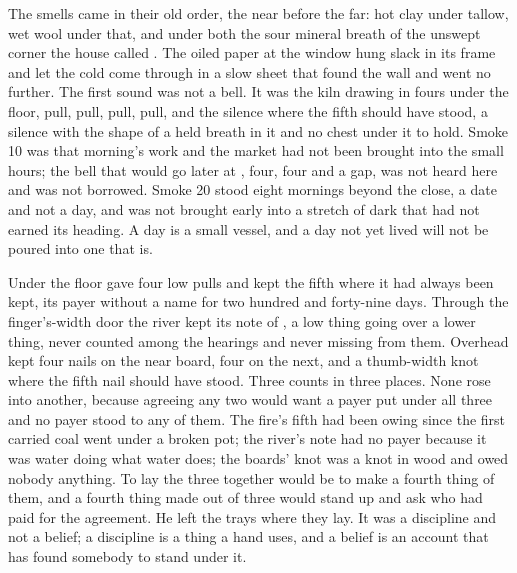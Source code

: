 The smells came in their old order, the near before the far: hot clay under tallow, wet wool under that, and under both the sour mineral breath of the unswept corner the house called . The oiled paper at the window hung slack in its frame and let the cold come through in a slow sheet that found the wall and went no further. The first sound was not a bell. It was the kiln drawing in fours under the floor, pull, pull, pull, pull, and the silence where the fifth should have stood, a silence with the shape of a held breath in it and no chest under it to hold. Smoke 10 was that morning's work and the market had not been brought into the small hours; the bell that would go later at , four, four and a gap, was not heard here and was not borrowed. Smoke 20 stood eight mornings beyond the close, a date and not a day, and was not brought early into a stretch of dark that had not earned its heading. A day is a small vessel, and a day not yet lived will not be poured into one that is.

Under the floor  gave four low pulls and kept the fifth where it had always been kept, its payer without a name for two hundred and forty-nine days. Through the finger's-width door the river kept its note of , a low thing going over a lower thing, never counted among the hearings and never missing from them. Overhead  kept four nails on the near board, four on the next, and a thumb-width knot where the fifth nail should have stood. Three counts in three places. None rose into another, because agreeing any two would want a payer put under all three and no payer stood to any of them. The fire's fifth had been owing since the first carried coal went under a broken pot; the river's note had no payer because it was water doing what water does; the boards' knot was a knot in wood and owed nobody anything. To lay the three together would be to make a fourth thing of them, and a fourth thing made out of three would stand up and ask who had paid for the agreement. He left the trays where they lay. It was a discipline and not a belief; a discipline is a thing a hand uses, and a belief is an account that has found somebody to stand under it.

\scenebreak

